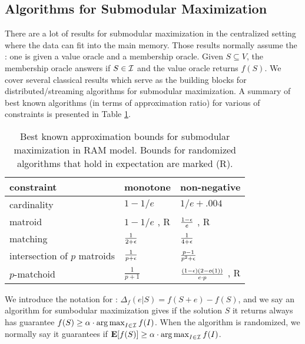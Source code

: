 \subsection{Algorithms for Submodular Maximization}
There are a lot of results for submodular maximization in the centralized setting where the data can fit into the main memory. Those results normally assume the : one is given a value oracle and a membership oracle. Given $S\subseteq V$, the membership oracle answers if $S \in \mathcal{I}$ and the value oracle returns $f(S)$. We cover several classical results which serve as the building blocks for distributed/streaming algorithms for submodular maximization. A summary of best known algorithms (in terms of approximation ratio) for various of constraints is presented in Table \ref{table:centralized}.
\begin{table}[t]
\centering
\begin{tabular}{|l|l|l|}
\hline
constraint & monotone  &  non-negative \\
\hline
cardinality & $1 - 1/e$  \cite{NWF78} & $1/e + .004$ \cite{BFN+14}\\
\hline
matroid & $1 - 1/e$ \cite{CCP+11}, R & $\frac{1 - \epsilon}{e}$ \cite{FNS11}, R \\
\hline
matching & $\frac{1}{2 + \epsilon}$ \cite{FNS+11} & $\frac{1}{4 + \epsilon}$ \cite{FNS+11}\\
\hline
intersection of $p$ matroids & $\frac{1}{p + \epsilon}$ \cite{LSV10} & $\frac{p - 1}{p^2 + \epsilon}$ \cite{LSV10}\\
\hline
$p$-matchoid & $\frac{1}{p + 1}$ \cite{CCP+11,NWF78} & $\frac{(1-\epsilon)(2-o(1))}{e\cdot p}$ \cite{FNS+11,VCZ11}, R\\
\hline
\end{tabular}
\caption{Best known approximation bounds for submodular maximization in RAM model. Bounds for randomized algorithms that hold in expectation are marked (R).}
\label{table:centralized}
\end{table}






We introduce the notation for : $\Delta_f(e|S) = f(S + e) - f(S)$, and we say an algorithm for sumbodular maximization gives  if the solution $S$ it returns always has guarantee $f(S) \geq \alpha \cdot \operatorname*{arg\,max}_{I\in\mathcal{I}}f(I)$. When the algorithm is randomized, we normally say it guarantees  if $\mathbf{E}[f(S)] \geq \alpha\cdot \operatorname*{arg\,max}_{I\in\mathcal{I}}f(I)$.


